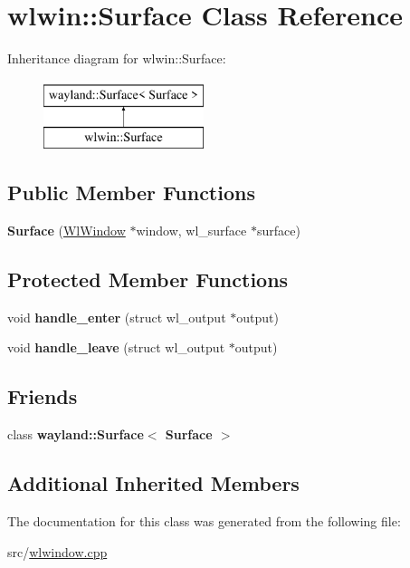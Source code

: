 \hypertarget{classwlwin_1_1Surface}{}\section{wlwin\+::Surface Class Reference}
\label{classwlwin_1_1Surface}
Inheritance diagram for wlwin\+::Surface\+:\begin{figure}[H]
\begin{center}
\leavevmode
\includegraphics[height=2.000000cm]{classwlwin_1_1Surface}
\end{center}
\end{figure}
\subsection*{Public Member Functions}
\begin{DoxyCompactItemize}
\item 
\mbox{\label{classwlwin_1_1Surface_ae8754a2ad2b6c76ccf4e6416793bf20b}} 
{\bfseries Surface} (\mbox{\hyperlink{classwlwin_1_1WlWindow}{Wl\+Window}} $\ast$window, wl\+\_\+surface $\ast$surface)
\end{DoxyCompactItemize}
\subsection*{Protected Member Functions}
\begin{DoxyCompactItemize}
\item 
\mbox{\label{classwlwin_1_1Surface_a2bcf7a11ead3ac41d319949ad290512c}} 
void {\bfseries handle\+\_\+enter} (struct wl\+\_\+output $\ast$output)
\item 
\mbox{\label{classwlwin_1_1Surface_adb12b5029d3dffd561ce00a4cc720999}} 
void {\bfseries handle\+\_\+leave} (struct wl\+\_\+output $\ast$output)
\end{DoxyCompactItemize}
\subsection*{Friends}
\begin{DoxyCompactItemize}
\item 
\mbox{\label{classwlwin_1_1Surface_ab03fc066846d0712c7a07934900feeac}} 
class {\bfseries wayland\+::\+Surface$<$ Surface $>$}
\end{DoxyCompactItemize}
\subsection*{Additional Inherited Members}


The documentation for this class was generated from the following file\+:\begin{DoxyCompactItemize}
\item 
src/\mbox{\hyperlink{wlwindow_8cpp}{wlwindow.\+cpp}}\end{DoxyCompactItemize}
